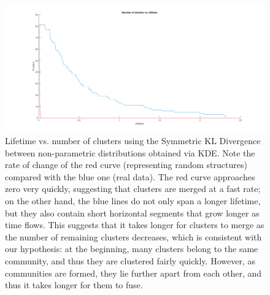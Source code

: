 \documentclass[pdftex,11pt,a4paper]{article}
\theoremstyle{definition}
\theoremstyle{remark}
\begin{document}
\begin{figure}[H]
\centering
\includegraphics[width=\textwidth]{images/lifetime_gmm_skld}
\caption{Lifetime vs. number of clusters using the Symmetric KL Divergence between non-parametric distributions obtained via KDE. Note the rate of change of the red curve (representing random structures) compared with the blue one (real data). The red curve approaches zero very quickly, suggesting that clusters are merged at a fast rate; on the other hand, the blue lines do not only span a longer lifetime, but they also contain short horizontal segments that grow longer as time flows. This suggests that it takes longer for clusters to merge as the number of remaining clusters decreases, which is consistent with our hypothesis: at the beginning, many clusters belong to the same community, and thus they are clustered fairly quickly. However, as communities are formed, they lie further apart from each other, and thus it takes longer for them to fuse.}
\label{fig_lifetime}
\end{figure}
\end{document}
